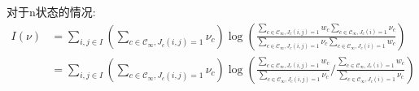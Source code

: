 \documentclass[cn,hazy,egreen,14pt,normal]{elegantnote}
\begin{document}


对于n状态的情况:
\begin{align*}
    I(\nu) &=  \sum_{i, j \in I} \left(\sum_{c \in \mathcal{C_{\infty}}, J_c(i, j)=1}
    \nu_c \right) \log(\frac{\sum_{c \in \mathcal{C_{\infty}}, J_c(i, j)=1} w_c \sum_{c \in \mathcal{C_{\infty}}, J_c(i)=1} \nu_c}{\sum_{c \in \mathcal{C_{\infty}}, J_c(i, j)=1} \nu_c \sum_{c \in \mathcal{C_{\infty}}, J_c(i)=1} w_c}) \\
    &= \sum_{i, j \in I} \left(\sum_{c \in \mathcal{C_{\infty}}, J_c(i, j)=1}
    \nu_c \right) \log(\frac{\sum_{c \in \mathcal{C_{\infty}}, J_c(i, j)=1} w_c }{\sum_{c \in \mathcal{C_{\infty}}, J_c(i, j)=1} \nu_c }
    /\frac{\sum_{c \in \mathcal{C_{\infty}}, J_c(i)=1} w_c}{\sum_{c \in \mathcal{C_{\infty}}, J_c(i)=1} \nu_c}) \\
\end{align*}
\end{document}
